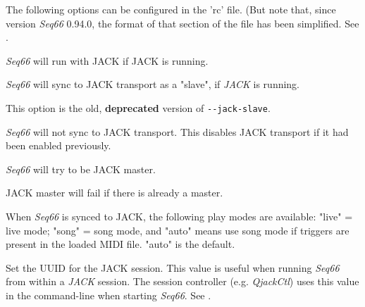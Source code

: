 
   The following options can be configured in the 'rc' file. (But note that,
   since version \textsl{Seq66} 0.94.0, the format of that section of the file
   has been simplified.
   See .

      \textsl{Seq66} will run with JACK if JACK is running.


      \textsl{Seq66} will sync to JACK transport as a "slave", if \textsl{JACK}
      is running.

      This option is the old, \textbf{deprecated} version of
      \texttt{-{}-jack-slave}.


      \textsl{Seq66} will not sync to JACK transport.
      This disables JACK transport if it had been enabled previously.


      \textsl{Seq66} will try to be JACK master.


      JACK master will fail if there is already a master.


      When \textsl{Seq66} is synced to JACK, the following play modes
      are available: "live" = live mode; "song" = song mode, and "auto" means
      use song mode if triggers are present in the loaded MIDI file. "auto" is
      the default.


      Set the UUID for the JACK session.  This value is useful when
      running \textsl{Seq66} from within a \textsl{JACK} session.
      The session controller (e.g. \textsl{QjackCtl}) uses this value in the
      command-line when starting \textsl{Seq66}.
      See .

